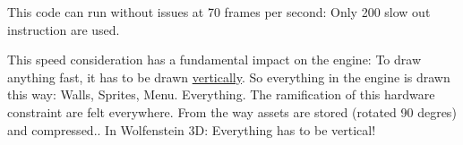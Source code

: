 \documentclass[book.tex]{subfiles}
\begin{document}
\begin{minipage}{\textwidth}

\end{minipage}

\par
This code can run without issues at 70 frames per second: Only 200 slow out instruction are used.\\
\par
This speed consideration has a fundamental impact on the engine: To draw anything fast, it has to be drawn \underline{vertically}. So everything in the engine is drawn this way: Walls, Sprites, Menu. Everything. The ramification of this hardware constraint are felt everywhere. From the way assets are stored (rotated 90 degres) and compressed.. In Wolfenstein 3D: Everything has to be vertical!\\
\end{document}
